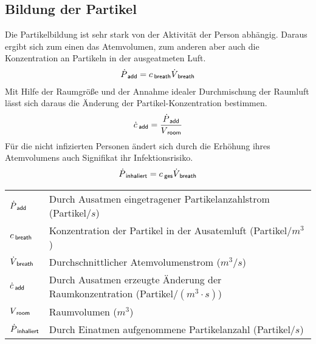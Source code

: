 \documentclass[12pt,a4paper,bibtotocnumbered,liststotocnumbered]{scrreprt}
\begin{document}
\subsection{Bildung der Partikel}
Die Partikelbildung ist sehr stark von der Aktivität der Person abhängig. Daraus ergibt sich zum einen das Atemvolumen, zum anderen aber auch die Konzentration an Partikeln in der ausgeatmeten Luft.
\begin{align}
\dot{P}_{\: \mathsf{add}} = c_{\: \mathsf{breath}}\dot{V}_{\: \mathsf{breath}}
\end{align}
Mit Hilfe der Raumgröße und der Annahme idealer Durchmischung der Raumluft lässt sich daraus die Änderung der Partikel-Konzentration bestimmen.
\begin{align}
\dot{c}_{\: \mathsf{add}} =\frac{\dot{P}_{\: \mathsf{add}}}{V_{\: \mathsf{room}}}
\end{align}
Für die nicht infizierten Personen ändert sich durch die Erhöhung ihres Atemvolumens auch Signifikat ihr Infektionsrisiko.
\begin{align}
\dot{P}_{\: \mathsf{inhaliert}} = c_{\: \mathsf{ges}}\dot{V}_{\: \mathsf{breath}}
\end{align}
\begin{tabular}{ll}
$\dot{P}_{\: \mathsf{add}}$ & Durch Ausatmen eingetragener Partikelanzahlstrom (Partikel$/s$)\\
$c_{\: \mathsf{breath}}$ & Konzentration der Partikel in der Ausatemluft (Partikel$/m^3$)\\
$\dot{V}_{\: \mathsf{breath}}$ & Durchschnittlicher Atemvolumenstrom ($m^3/s$)\\
$\dot{c}_{\: \mathsf{add}}$ & Durch Ausatmen erzeugte Änderung der  Raumkonzentration (Partikel$/(m^3\cdot s)$)\\
$V_{\: \mathsf{room}}$ & Raumvolumen ($m^3$)\\
$\dot{P}_{\: \mathsf{inhaliert}}$ & Durch Einatmen aufgenommene Partikelanzahl (Partikel$/s$)\\
\end{tabular}
\end{document}
